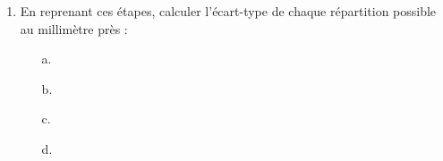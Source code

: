 \documentclass[
	classe=$2^{de}$,
	headerTitle=Activité,
	landscape,
	twocolumn
]{exercice}
\begin{document}
{\begin{enumerate}
		      On obtient alors l'\textbf{écart-type}.
		\item En reprenant ces étapes, calculer l'écart-type de chaque répartition possible au millimètre près :
		      \begin{multicols}{2}
			      \begin{itemize}
				      \item[a.] 
				      \item[b.] 
				      \item[c.] 
				      \item[d.] 
			      \end{itemize}
		      \end{multicols}
	\end{enumerate}
}

\Activite

\ifdefined\makeCorrection
\else
	\newpage
	\Activite
\fi
\end{document}
